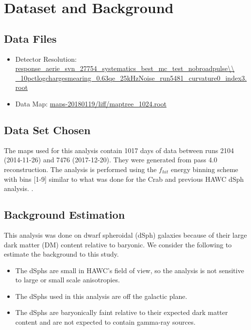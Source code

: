\section{Dataset and Background \label{sec:gd_databgd}}

\subsection{Data Files}\label{sec:gd_data}
\begin{itemize}
    \item Detector Resolution: \url{response\_aerie\_svn\_27754\_systematics\_best\_mc\_test\_nobroadpulse\\
    \_10pctlogchargesmearing\_0.63qe\_25kHzNoise\_run5481\_curvature0\_index3.root}
    \item Data Map: \url{maps-20180119/liff/maptree\_1024.root}
\end{itemize}

\subsection{Data Set Chosen}

The maps used for this analysis contain 1017 days of data between runs 2104 (2014-11-26) and 7476 (2017-12-20). They were generated from pass 4.0 reconstruction.
The analysis is performed using the $f_{hit}$ energy binning scheme with bins [1-9] similar to what was done for the Crab and previous HAWC dSph analysis. \cite{Abeysekara_2017,Albert_2018}.

\subsection{Background Estimation}\label{sec:gd_bkgd}

This analysis was done on dwarf spheroidal (dSph) galaxies because of their large dark matter (DM) content relative to baryonic.
We consider the following to estimate the background to this study.

\begin{itemize}
    \item The dSphs are small in HAWC's field of view, so the analysis is not sensitive to large or small scale anisotropies.
    \item The dSphs used in this analysis are off the galactic plane.
    \item The dSphs are baryonically faint relative to their expected dark matter content and are not expected to contain gamma-ray sources.
\end{itemize}

